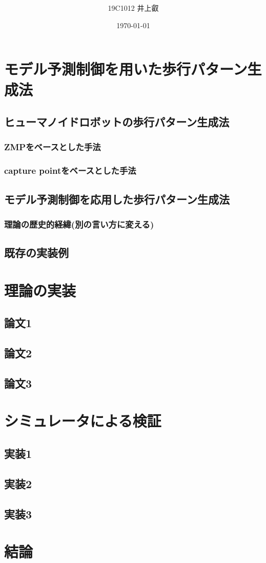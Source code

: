 \documentclass[uplatex, a4paper, 12pt, openany, oneside]{jsbook}
\title{
  \centering
    \scalebox{1.0}{モデル予測制御を利用したヒューマノイドロボットの}\\
    \vspace{-0.3zh}
    \scalebox{1.0}{歩行パターン生成器の実装}
    \vspace{-0.6zh}
}
\date{\today}
\author{19C1012 井上叡}
\begin{document}
\frontmatter{}
%

%
\mainmatter{}
%

%
\chapter{モデル予測制御を用いた歩行パターン生成法}
\section{ヒューマノイドロボットの歩行パターン生成法}
\subsection{ZMPをベースとした手法}
\subsection{capture pointをベースとした手法}
\section{モデル予測制御を応用した歩行パターン生成法}
\subsection{理論の歴史的経緯(別の言い方に変える)}
\section{既存の実装例}

\chapter{理論の実装}
\section{論文1}
\section{論文2}
\section{論文3}

\chapter{シミュレータによる検証}
\section{実装1}
\section{実装2}
\section{実装3}


\chapter{結論}

\backmatter{}
%

%
\end{document}
